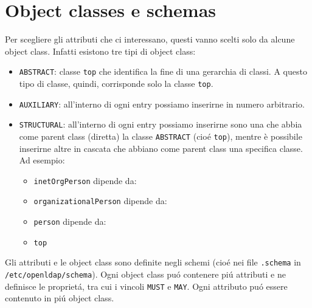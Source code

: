 \documentclass[11pt, a4paper, oneside]{article}
\begin{document}
		\section{Object classes e schemas}
			\par
				Per scegliere gli attributi che ci 
				interessano, questi vanno scelti solo da 
				alcune object class. Infatti esistono tre tipi 
				di object class:
			\begin{itemize}
				\item
					\texttt{ABSTRACT}: classe \texttt{top} 
					che identifica la fine di una gerarchia 
					di classi. A questo tipo di classe, 
					quindi, corrisponde solo la classe 
					\texttt{top}.
				\item
					\texttt{AUXILIARY}: all'interno di 
					ogni entry possiamo inserirne in 
					numero arbitrario.
				\item
					\texttt{STRUCTURAL}: all'interno di 
					ogni entry possiamo inserirne sono una 
					che abbia come parent class (diretta) 
					la classe \texttt{ABSTRACT} 
					(cio\'e \texttt{top}), mentre è 
					possibile inserirne altre in cascata 
					che abbiano  come parent class una 
					specifica classe. Ad esempio:
					\begin{itemize}
						\item
							\texttt{inetOrgPerson}
							dipende da:
						\item
							\texttt{organizationalPerson}
							dipende da:
						\item
							\texttt{person} dipende 
							da:
						\item
							\texttt{top}
					\end{itemize}
			\end{itemize}
			\par
				Gli attributi e le object class sono definite 
				negli schemi (cio\'e nei file \texttt{.schema}
				in \texttt{/etc/openldap/schema}).
				Ogni object class pu\'o contenere pi\'u
				attributi e ne definisce le propriet\'a, tra 
				cui i vincoli \texttt{MUST} e \texttt{MAY}.
				Ogni attributo pu\'o essere contenuto in pi\'u
				object class.
\end{document}
